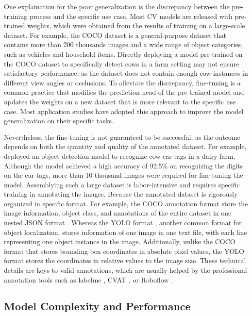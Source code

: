 One explaination for the poor generalization is the discrepancy between the pre-training process and the specific use case. Most CV models are released with pre-trained weights, which were obtained from the results of training on a large-scale dataset. For example, the COCO dataset \cite{lin2014microsoft} is a general-purpose dataset that contains more than 200 thousands images and a wide range of object categories, such as vehicles and household items. Directly deploying a model pre-trained on the COCO dataset to specifically detect cows in a farm setting may not ensure satisfactory performance, as the dataset does not contain enough cow instances in different view angles or occlusions. To alleviate the discrepancy, fine-tuning is a common practice that modifies the prediction head of the pre-trained model and updates the weights on a new dataset that is more relevant to the specific use case. Most application studies have adopted this approach to improve the model generalization on their specific tasks\cite{han2021pre,guirguis2022cfa,gupta2023novel}.

Nevertheless, the fine-tuning is not guaranteed to be successful, as the outcome depends on both the quantity and quality of the annotated dataset. For example, \cite{zin_automatic_2020} deployed an object detection model to recognize cow ear tags in a dairy farm. Although the model achieved a high accuracy of 92.5\% on recognizing the digits on the ear tags, more than 10 thousand images were required for fine-tuning the model. Assemblying such a large dataset is labor-intensive and requires specific training in annotating the images. Because the annotated dataset is rigorously organized in specific format. For example, the COCO annotation format \cite{lin2014microsoft} store the image information, object class, and annotations of the entire dataset in one nested JSON format \cite{lin2014microsoft}. Whereas the YOLO format \cite{ultralytics2023datasets}, another common format for object localization, stores information of one image in one text file, with each line representing one object instance in the image. Additionally, unlike the COCO format that stores bounding box coordinates in absolute pixel values, the YOLO format stores the coordinates in relative values to the image size. These technical details are keys to valid annotations, which are usually helped by the professional annotation tools such as labelme \cite{labelme2023}, CVAT \cite{cvat2023}, or Roboflow \cite{roboflow2023}.

\subsection*{Model Complexity and Performance}

